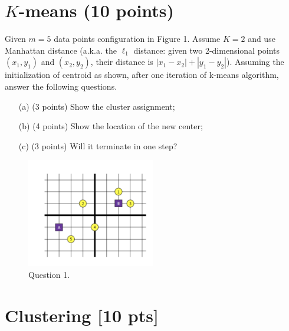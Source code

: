 \documentclass[a4paper,12pt,fleqn]{article}
\begin{document}
\clearpage

\section{\bf $K$-means (10 points)}

Given $m = 5$ data points configuration in Figure 1. Assume $K = 2$ and use Manhattan distance (a.k.a. the $\ell_1$ distance: given two 2-dimensional points $(x_1, y_1)$ and $(x_2, y_2)$, their distance is $|x_1 - x_2| + |y_1 - y_2|$).  Assuming the initialization of centroid as shown, after one iteration of k-means algorithm, answer the following questions. 

\begin{enumerate}
\item[(a)] (3 points) Show the cluster assignment;
\item[(b)] (4 points) Show the location of the new center;
\item[(c)] (3 points) Will it terminate in one step?
\end{enumerate}

\begin{figure}[h!]
\begin{center}
\includegraphics[width = 0.5\textwidth]{./fig/points.png}
\end{center}
\caption{Question 1.}
\end{figure}


\clearpage
\section{Clustering [10 pts]}
\end{document}
